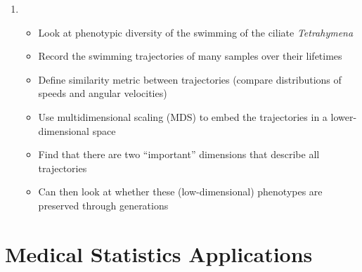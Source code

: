 \documentclass[12pt]{article}
\begin{document}
\begin{enumerate}
\item {}
\begin{itemize}
	\item Look at phenotypic diversity of the swimming of the ciliate {\em Tetrahymena}
	\item Record the swimming trajectories of many samples over their lifetimes
	\item Define similarity metric between trajectories (compare distributions of speeds and angular velocities)
	\item Use multidimensional scaling (MDS) to embed the trajectories in a lower-dimensional space
	\item Find that there are two ``important'' dimensions that describe all trajectories
	\item Can then look at whether these (low-dimensional) phenotypes are preserved through generations
\end{itemize}

\end{enumerate}

\section{Medical Statistics Applications}
\end{document}
